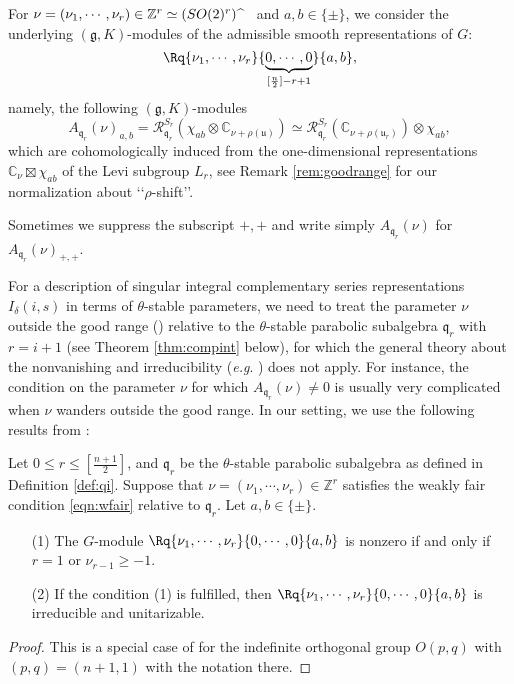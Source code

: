 For $\nu=(\nu_1, \cdots, \nu_r) \in {\mathbb{Z}}^r \simeq (SO(2)^r)\hspace{1mm}
{\widehat{}}\hphantom{ii}$
 and $a, b \in \{\pm\}$, 
 we consider the underlying $({\mathfrak{g}},K)$-modules
 of the admissible smooth representations of $G$:
\[
  \Rq {\nu_1, \cdots, \nu_r}{\underbrace{0,\cdots,0}_{[\frac n 2]-r+1}}{a, b}, 
\]
 namely, 
the following $({\mathfrak{g}},K)$-modules
\[
  A_{\mathfrak{q}_r}(\nu)_{a, b}
   ={\mathcal{R}}_{\mathfrak{q}_r}^{S_r}
     (\chi_{ab} \otimes {\mathbb{C}}_{\nu+\rho({\mathfrak{u}})})
   \simeq 
   {\mathcal{R}}_{\mathfrak{q}_r}^{S_r}
   ({\mathbb{C}}_{\nu+\rho({\mathfrak{u}}_r)}) \otimes \chi_{ab}, 
\]
which are cohomologically induced from the one-dimensional representations
 ${\mathbb{C}}_{\nu} \boxtimes \chi_{a b}$
 of the Levi subgroup $L_r$, 
 see Remark \ref{rem:goodrange}
 for our normalization about \lq\lq{$\rho$-shift}\rq\rq.  



Sometimes we suppress the subscript $+,+$
 and write simply $A_{{\mathfrak{q}}_{r}}(\nu)$
 for $A_{{\mathfrak{q}}_{r}}(\nu)_{+,+}$.  



For a description of singular integral complementary series representations
 $I_{\delta}(i,s)$
 in terms of $\theta$-stable parameters,
 we need to treat the parameter $\nu$ outside the good range 
 (\cite[Def.~0.49]{KV})
 relative to the $\theta$-stable parabolic subalgebra ${\mathfrak {q}}_r$
 with $r = i+1$
 (see Theorem \ref{thm:compint} below), 
 for which the general theory 
 about the nonvanishing and irreducibility
 ({\it{e.g}}. \cite[Thm.~0.50]{KV})
 does not apply.  
For instance, 
the condition on the parameter $\nu$
 for which $A_{\mathfrak{q}_r}(\nu) \ne 0$
 is usually very complicated 
 when $\nu$ wanders outside the
 good range.  
In our setting, 
 we use the following results from \cite{KMemoirs92}:
\begin{fact}
\label{fact:Memo92}
Let $0 \le r \le [\frac{n+1}{2}]$, 
 and $\mathfrak{q}_r$ be the $\theta$-stable parabolic subalgebra
 as defined in Definition \ref{def:qi}.  
Suppose that $\nu=(\nu_1, \cdots, \nu_r) \in {\mathbb{Z}}^r$
 satisfies the weakly fair condition \eqref{eqn:wfair}
 relative to ${\mathfrak{q}}_r$.  
Let $a, b \in \{\pm\}$.  
\begin{enumerate}
\item[{\rm{(1)}}]
The $G$-module $\Rq{\nu_1, \cdots, \nu_r}{0,\cdots,0}{a, b}$
 is nonzero
 if and only if
 $r=1$ or $\nu_{r-1} \ge -1$.  
\item[{\rm{(2)}}]
If the condition (1) is fulfilled, 
then $\Rq{\nu_1, \cdots, \nu_r}{0,\cdots,0}{a, b}$ is irreducible 
 and unitarizable.  
\end{enumerate}
\end{fact}
\begin{proof}
This is a special case
 of \cite[Thm.~3]{KMemoirs92}
 for the indefinite orthogonal group $O(p,q)$
 with $(p,q)=(n+1,1)$
 with the notation there.  
\end{proof}


